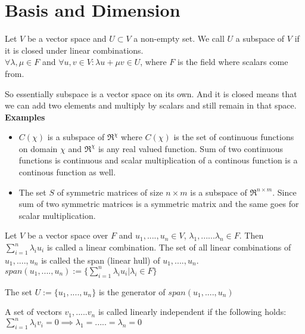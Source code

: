 \chapter{Basis and Dimension}

\begin{definition}
	Let $V$ be a vector space and $U \subset V$ a non-empty set. We call $U$ a subspace of $V$ if it is closed under linear combinations. \\
	$ \forall \lambda, \mu \in F$ and $\forall u, v \in V : \lambda u + \mu v \in U$, where $F$ is the field where scalars come from. 
\end{definition}

So essentially subspace is a vector space on its own. And it is closed means that we can add two elements and multiply by scalars and still remain in that space. \\

\textbf{Examples}

\begin{itemize}
	\item $C(\chi)$ is a subspace of $\Re^\chi$ where $C(\chi)$ is the set of continuous functions on domain $\chi$ and $\Re^\chi$ is any real valued function. Sum of two continuous functions is continuous and scalar multiplication of a continous function is a continous function as well. 
	\item The set $S$ of symmetric matrices of size $n \times m$ is a subspace of $\Re^{n \times m}$. Since sum of two symmetric matrices is a symmetric matrix and the same goes for scalar multiplication.  
\end{itemize}

\begin{definition}
	Let $V$ be a vector space over $F$ and $u_1,....,u_n \in V$, $\lambda_1,......\lambda_n \in F$. Then $\sum_{i=1}^{n} \lambda_i u_i$ is called a linear combination. The set of all linear combinations of $u_1,....,u_n$ is called the span (linear hull) of $u_1,....,u_n$. \\
	$span(u_1,....,u_n) := \{\sum_{i=1}^{n} \lambda_i u_i | \lambda_i \in F \}$  
\end{definition}

The set $U:= \{ u_1,....,u_n \}$ is the generator of $span(u_1,....,u_n)$

\begin{definition}
	A set of vectors $v_1,.....v_n$ is called linearly independent if the following holds: \\
	$ \sum_{i=1}^{n} \lambda_i v_i = 0 \implies \lambda_1 = ..... = \lambda_n = 0$ \\
\end{definition}

